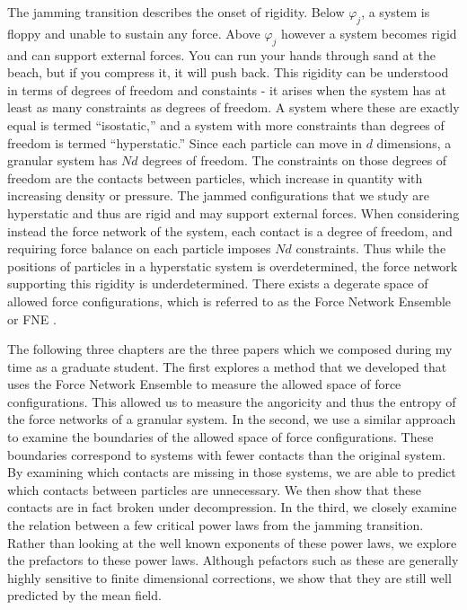 The jamming transition describes the onset of rigidity. Below $\varphi_j$, a system is floppy and unable to sustain any force. Above $\varphi_j$ however a system becomes rigid and can support external forces. You can run your hands through sand at the beach, but if you compress it, it will push back. This rigidity can be understood in terms of degrees of freedom and constaints - it arises when the system has at least as many constraints as degrees of freedom. A system where these are exactly equal is termed ``isostatic,'' and a system with more constraints than degrees of freedom is termed ``hyperstatic.'' Since each particle can move in $d$ dimensions, a granular system has $Nd$ degrees of freedom. The constraints on those degrees of freedom are the contacts between particles, which increase in quantity with increasing density or pressure. The jammed configurations that we study are hyperstatic and thus are rigid and may support external forces. When considering instead the force network of the system, each contact is a degree of freedom, and requiring force balance on each particle imposes $Nd$ constraints. Thus while the positions of particles in a hyperstatic system is overdetermined, the force network supporting this rigidity is underdetermined. There exists a degerate space of allowed force configurations, which is referred to as the Force Network Ensemble or FNE \cite{snoeijer_force_2004,tighe_force_2010}. 

The following three chapters are the three papers which we composed during my time as a graduate student. The first explores a method that we developed that uses the Force Network Ensemble to measure the allowed space of force configurations. This allowed us to measure the angoricity and thus the entropy of the force networks of a granular system. In the second, we use a similar approach to examine the boundaries of the allowed space of force configurations. These boundaries correspond to systems with fewer contacts than the original system. By examining which contacts are missing in those systems, we are able to predict which contacts between particles are unnecessary. We then show that these contacts are in fact broken under decompression. In the third, we closely examine the relation between a few critical power laws from the jamming transition. Rather than looking at the well known exponents of these power laws, we explore the prefactors to these power laws. Although pefactors such as these are generally highly sensitive to finite dimensional corrections, we show that they are still well predicted by the mean field.
